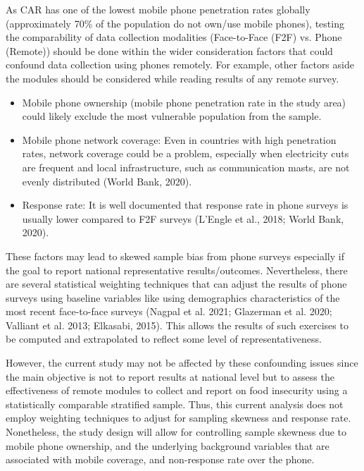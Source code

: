 \documentclass[11pt,harvard]{article}
\begin{document}
	As CAR has one of the lowest mobile phone penetration rates globally (approximately 70\% of the population do not own/use mobile phones), testing the comparability of data collection modalities (Face-to-Face (F2F) vs. Phone (Remote)) should be done within the wider consideration factors that could confound data collection using phones remotely. For example, other factors aside the modules should be considered while reading results of any remote survey.
	
	\begin{itemize}[label=--, left=1.5em]
		\item[1.]	Mobile phone ownership (mobile phone penetration rate in the study area) could likely exclude the most vulnerable population from the sample. 
		\item[2.]	Mobile phone network coverage: Even in countries with high penetration rates, network coverage could be a problem, especially when electricity cuts are frequent and local infrastructure, such as communication masts, are not evenly distributed (World Bank, 2020).
		\item[3.]	Response rate: It is well documented that response rate in phone surveys is usually lower compared to F2F surveys (L’Engle et al., 2018; World Bank, 2020). 
	\end{itemize}
	
	These factors may lead to skewed sample bias from phone surveys especially if the goal to report national representative results/outcomes. Nevertheless, there are several statistical weighting techniques that can adjust the results of phone surveys using baseline variables like using demographics characteristics of the most recent face-to-face surveys (Nagpal et al. 2021; Glazerman et al. 2020; Valliant et al. 2013; Elkasabi, 2015). This allows the results of such exercises to be computed and extrapolated to reflect some level of representativeness. 
	
	However, the current study may not be affected by these confounding issues since the main objective is not to report results at national level but to assess the effectiveness of remote modules to collect and report on food insecurity using a statistically comparable stratified sample. Thus, this current analysis does not employ weighting techniques to adjust for sampling skewness and response rate. Nonetheless, the study design will allow for controlling sample skewness due to mobile phone ownership, and the underlying background variables that are associated with mobile coverage, and non-response rate over the phone.
	
\end{document}
